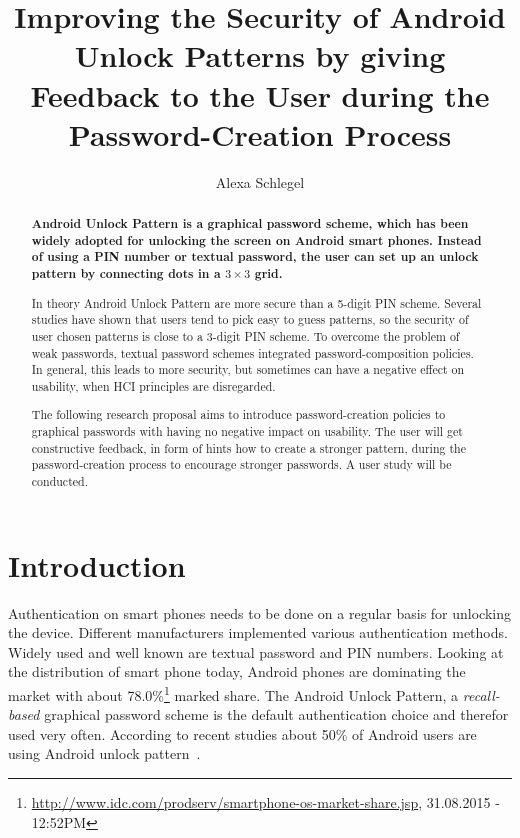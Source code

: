 \documentclass[twocolumn, a4paper, 10pt]{article}
\begin{document}
\title{
	Improving the Security of Android Unlock Patterns by giving Feedback to the User during the Password-Creation Process}

\author{
	Alexa Schlegel
}

\maketitle


\def\abstractname{{\textbf Abstract}}
\begin{abstract}
{
\bfseries
Android Unlock Pattern is a graphical password scheme, which has been widely adopted for unlocking the screen on Android smart phones. Instead of using a PIN number or textual password, the user can set up an unlock pattern by connecting dots in a $3\times3$ grid.

In theory Android Unlock Pattern are more secure than a 5-digit PIN scheme. Several studies have shown that users tend to pick easy to guess patterns, so the security of user chosen patterns is close to a 3-digit PIN scheme. To overcome the problem of weak passwords, textual password schemes integrated password-composition policies. In general, this leads to more security, but sometimes can have a negative effect on usability, when HCI principles are disregarded.

The following research proposal aims to introduce password-creation policies to graphical passwords with having no negative impact on usability. The user will get constructive feedback, in form of hints how to create a stronger pattern, during the password-creation process to encourage stronger passwords.  A user study will be conducted.
}
\end{abstract}


\section{Introduction}
\label{sec:intro}

Authentication on smart phones needs to be done on a regular basis for unlocking the device. Different manufacturers implemented various authentication methods. Widely used and well known are textual password and PIN numbers. Looking at the distribution of smart phone today, Android phones are dominating the market with about 78.0\%\footnote{\url{http://www.idc.com/prodserv/smartphone-os-market-share.jsp}, 31.08.2015 - 12:52PM} marked share. The Android Unlock Pattern, a \textit{recall-based} graphical password scheme is the default authentication choice and therefor used very often. According to recent studies about 50\% of Android users are using Android unlock pattern~\cite{VanBruggen:2013:MSU:2501604.2501614, van2014studying}.
\end{document}

